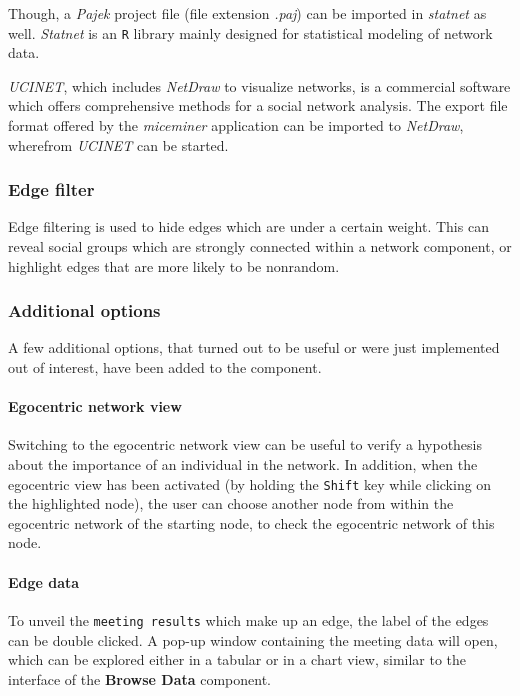 Though, a \textit{Pajek} project file (file extension \textit{.paj}) can be imported in \textit{statnet}\cite{statnet:03} as well. \textit{Statnet} is an \lstinline|R|\cite{r:05} library mainly designed for statistical modeling of network data.

\textit{UCINET}\cite{ucinet:99}, which includes \textit{NetDraw} to visualize networks, is a commercial software which offers comprehensive methods for a social network analysis. The export file format offered by the \textit{miceminer} application can be imported to \textit{NetDraw}, wherefrom \textit{UCINET} can be started.

\subsubsection*{Edge filter}

Edge filtering is used to hide edges which are under a certain weight. This can reveal social groups which are strongly connected within a network component, or highlight edges that are more likely to be nonrandom.

\subsubsection*{Additional options}

A few additional options, that turned out to be useful or were just implemented out of interest, have been added to the component.

\paragraph{Egocentric network view}

Switching to the egocentric network view can be useful to verify a hypothesis about the importance of an individual in the network. In addition, when the egocentric view has been activated (by holding the \lstinline|Shift| key while clicking on the highlighted node), the user can choose another node from within the egocentric network of the starting node, to check the egocentric network of this node.

\paragraph{Edge data}

To unveil the \lstinline|meeting results| which make up an edge, the label of the edges can be double clicked. A pop-up window containing the meeting data will open, which can be explored either in a tabular or in a chart view, similar to the interface of the \textbf{Browse Data} component.


